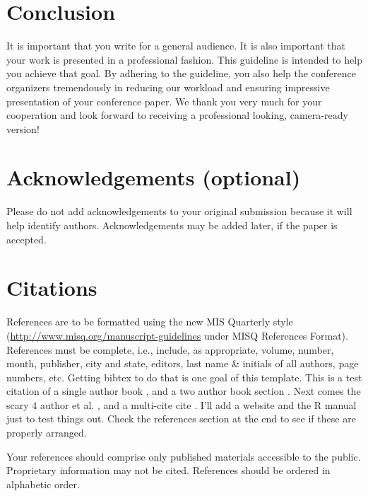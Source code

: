 \documentclass{icis}
\begin{document}
\section{Conclusion}
It is important that you write for a general audience. It is also important that your work is presented in a professional fashion. This guideline is intended to help you achieve that goal. By adhering to the guideline, you also help the conference organizers tremendously in reducing our workload and ensuring impressive presentation of your conference paper. We thank you very much for your cooperation and look forward to receiving a professional looking, camera-ready version! 

\section{Acknowledgements (optional)}
Please do not add acknowledgements to your original submission because it will help identify authors. Acknowledgements may be added later, if the paper is accepted.

\section{Citations}

References are to be formatted using the new MIS Quarterly style (\url{http://www.misq.org/manuscript-guidelines} under MISQ References Format). References must be complete, i.e., include, as appropriate, volume, number, month, publisher, city and state, editors, last name \& initials of all authors, page numbers, etc. Getting bibtex to do that is one goal of this
template. This is a test citation of a single author book
\autocite{bonini_simulation_1963}, and a two author book section
\autocite{chenhall_formal_1989}. Next comes the scary 4 author et
al. \autocite{zhang2006}, and a multi-cite cite \autocite{bonini_simulation_1963,
  ackoff_management_1961}.  I'll add a website \autocite{Ahlers2013} and the R manual
\autocite{R2014} just to test things out. Check the references section at the end to see if these are properly arranged.

Your references should comprise only published materials accessible to the public. Proprietary information may not be cited.
References should be ordered in alphabetic order.

% 
% 

\printbibliography
\end{document}

